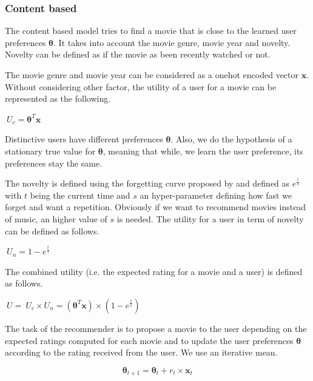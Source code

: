 \documentclass[letterpaper]{article}
\begin{document}
\subsubsection{Content based}

The content based model tries to find a movie that is close to the learned user preferences $\boldsymbol{\theta}$. It takes into account the movie genre, movie year and novelty. Novelty can be defined as if the movie as been recently watched or not.

The movie genre and movie year can be considered as a onehot encoded vector $\boldsymbol{x}$.
Without considering other factor, the utility of a user for a movie can be represented as the following.

\begin{center}
	$ \ U_{c} = \boldsymbol{\theta}^{T} \boldsymbol{x}$ 
\end{center}

Distinctive users have different preferences $\boldsymbol{\theta}$. Also, we do the hypothesis of a stationary true value for $\boldsymbol{\theta}$, meaning that while, we learn the user preference, its preferences stay the same.

The novelty is defined using the forgetting curve proposed by \cite{ebbinghaus1913memory} and defined as $ e^{\frac{t}{s}} $ with $t$ being the current time and $s$ an hyper-parameter defining how fast we forget and want a repetition. Obviously if we want to recommend movies instead of music, an higher value of $s$ is needed. The utility for a user in term of novelty can be defined as follows.

\begin{center}
	$ \ U_{n} = 1 - e^{\frac{t}{s}} $ 
\end{center}

The combined utility (i.e. the expected rating for a movie and a user) is defined as follows.

\begin{center}
	$ \ U = \ U_{c} \times  U_{n} = (\boldsymbol{\theta}^{T} \boldsymbol{x}) \times (1 - e^{\frac{t}{s}}) $ 
\end{center}

The task of the recommender is to propose a movie to the user depending on the expected ratings computed for each movie and to update the user preferences $\boldsymbol{\theta}$ according to the rating received from the user. We use an iterative mean.

$$ \boldsymbol{\theta}_{t+1} = \boldsymbol{\theta}_{t} + r_{t} \times \boldsymbol{x}_{t} $$
\end{document}
